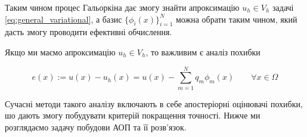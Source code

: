 Таким чином процес Гальоркіна дає змогу знайти апроксимацію $u_h \in V_h$ задачі \ref{eq:general_variational},
	а базис $\lbrace \phi_i(x)\rbrace_{i=1}^N$ можна обрати таким чином, який дасть змогу проводити ефективні обчислення.


Якщо ми маємо апроксимацію $u_h \in V_h$, то важливим є аналіз похибки

\begin{equation}
	e(x) := u(x) - u_h(x) = u(x) - \sum\limits_{m=1}^N q_m \phi_m (x) \qquad \forall x \in \Omega
\end{equation}

Сучасні методи такого аналізу включають в себе апостеріорні оцінювачі похибки, шо дають змогу побудувати критерій покращення точності.
Нижче ми розглядаємо задачу побудови АОП та її розв'язок.
